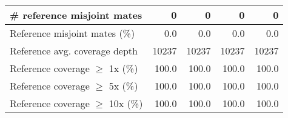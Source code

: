 \documentclass[12pt,a4paper]{article}
\begin{document}
\begin{table}[ht]
\begin{center}
\begin{tabular}{|l*{4}{|r}|}
\# reference misjoint mates & 0 & 0 & 0 & 0 \\ \hline
Reference misjoint mates (\%) & 0.0 & 0.0 & 0.0 & 0.0 \\ \hline
Reference avg. coverage depth & 10237 & 10237 & 10237 & 10237 \\ \hline
Reference coverage $\geq$ 1x (\%) & 100.0 & 100.0 & 100.0 & 100.0 \\ \hline
Reference coverage $\geq$ 5x (\%) & 100.0 & 100.0 & 100.0 & 100.0 \\ \hline
Reference coverage $\geq$ 10x (\%) & 100.0 & 100.0 & 100.0 & 100.0 \\ \hline
\end{tabular}
\end{center}
\end{table}
\end{document}
